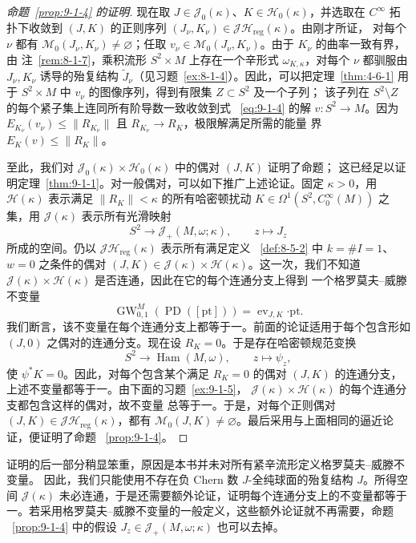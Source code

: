 \begin{proof}[命题~\ref{prop:9-1-4} 的证明]
现在取 $J\in\mathcal J_0(\kappa)$、$K\in\mathcal H_0(\kappa)$，并选取在
$C^\infty$ 拓扑下收敛到 $(J,K)$ 的正则序列
$(J_\nu,K_\nu)\in\mathcal J\mathcal H_{\mathrm{reg}}(\kappa)$。由刚才所证，
对每个 $\nu$ 都有 $\mathcal M_0(J_\nu,K_\nu)\ne\varnothing$；任取
$v_\nu\in\mathcal M_0(J_\nu,K_\nu)$。由于 $K_\nu$ 的曲率一致有界，由
注~\ref{rem:8-1-7}，乘积流形 $S^2\times M$ 上存在一个辛形式
$\omega_{K,\kappa}$，对每个 $\nu$ 都驯服由 $J_\nu,K_\nu$ 诱导的殆复结构
$\widetilde J_\nu$（见习题~\ref{ex:8-1-4}）。因此，可以把定理~\ref{thm:4-6-1}
用于 $S^2\times M$ 中 $v_\nu$ 的图像序列，得到有限集 $Z\subset S^2$ 及一个子列；
该子列在 $S^2\setminus Z$ 的每个紧子集上连同所有阶导数一致收敛到式
~\eqref{eq:9-1-4} 的解 $v:S^2\to M$。因为
$E_{K_\nu}(v_\nu)\le\|R_{K_\nu}\|$ 且 $R_{K_\nu}\to R_K$，极限解满足所需的能量
界 $E_K(v)\le\|R_K\|$。

至此，我们对
$\mathcal J_0(\kappa)\times\mathcal H_0(\kappa)$ 中的偶对 $(J,K)$ 证明了命题；
这已经足以证明定理~\ref{thm:9-1-1}。对一般偶对，可以如下推广上述论证。固定
$\kappa>0$，用 $\mathcal H(\kappa)$ 表示满足 $\|R_K\|<\kappa$ 的所有哈密顿扰动
$K\in\Omega^1(S^2,C_0^\infty(M))$ 之集，用 $\mathcal J(\kappa)$ 表示所有光滑映射
\[
  S^2\longrightarrow\mathcal J_+(M,\omega;\kappa),\qquad z\longmapsto J_z
\]
所成的空间。仍以 $\mathcal J\mathcal H_{\mathrm{reg}}(\kappa)$ 表示所有满足定义
~\ref{def:8-5-2} 中 $k=\#I=1$、$w=0$ 之条件的偶对
$(J,K)\in\mathcal J(\kappa)\times\mathcal H(\kappa)$。这一次，我们不知道
$\mathcal J(\kappa)\times\mathcal H(\kappa)$ 是否连通，因此在它的每个连通分支上得到
一个格罗莫夫--威滕不变量
\[
  \operatorname{GW}_{0,1}^M(\operatorname{PD}([\mathrm{pt}]))
  =\operatorname{ev}_{J,K}\mathbin{\boldsymbol\cdot}\mathrm{pt}.
\]
我们断言，该不变量在每个连通分支上都等于一。前面的论证适用于每个包含形如 $(J,0)$
之偶对的连通分支。现在设 $R_K=0$。于是存在哈密顿规范变换
\[
  S^2\longrightarrow\operatorname{Ham}(M,\omega),\qquad z\longmapsto\psi_z,
\]
使 $\psi^*K=0$。因此，对每个包含某个满足 $R_K=0$ 的偶对 $(J,K)$ 的连通分支，
上述不变量都等于一。由下面的习题~\ref{ex:9-1-5}，
$\mathcal J(\kappa)\times\mathcal H(\kappa)$ 的每个连通分支都包含这样的偶对，故不变量
总等于一。于是，对每个正则偶对
$(J,K)\in\mathcal J\mathcal H_{\mathrm{reg}}(\kappa)$，都有
$\mathcal M_0(J,K)\ne\varnothing$。最后采用与上面相同的逼近论证，便证明了命题
~\ref{prop:9-1-4}。
\end{proof}

证明的后一部分稍显笨重，原因是本书并未对所有紧辛流形定义格罗莫夫--威滕不变量。
因此，我们只能使用不存在负 Chern 数 $J$-全纯球面的殆复结构 $J$。所得空间
$\mathcal J(\kappa)$ 未必连通，于是还需要额外论证，证明每个连通分支上的不变量都等于
一。若采用格罗莫夫--威滕不变量的一般定义，这些额外论证就不再需要，命题
~\ref{prop:9-1-4} 中的假设 $J_z\in\mathcal J_+(M,\omega;\kappa)$ 也可以去掉。

